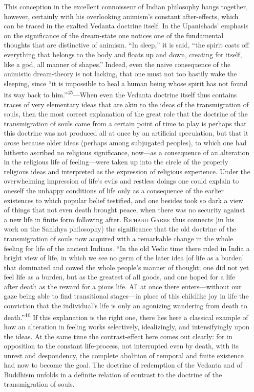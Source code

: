 \documentclass[12pt,a4paper]{book}
\newcommand{\opage}[1]{\marginnote{\footnotesize\textit{[#1]}}}
\begin{document}
This conception in the excellent connoisseur of Indian philosophy hangs together, however,
certainly with his overlooking animism's constant after-effects, which can be traced in the
exalted Vedanta doctrine itself. In the Upanishads' emphasis on the significance of the
dream-state one notices one of the fundamental thoughts that are distinctive of animism.
``In sleep,'' it is said, ``the spirit casts off everything that belongs to the body and
floats up and down, creating for itself, like a god, all manner of shapes.'' Indeed, even the
naive consequence of the animistic dream-theory is not lacking, that one must not too hastily
wake the sleeping, since ``it is impossible to heal a human being whose spirit has not found
its way back to him.''\textsuperscript{45}---When even the Vedanta doctrine itself thus
contains traces of very elementary ideas that are akin to the ideas of the transmigration of
souls, then the most correct explanation of the great role that the doctrine of the
transmigration of souls came from a certain point of time to play is perhaps that this doctrine
was not produced all at once by an artificial speculation, but that it 
\opage{99}arose because older
ideas (perhaps among subjugated peoples), to which one had hitherto ascribed no religious
significance, now---as a consequence of an alteration in the religious life of feeling---were
taken up into the circle of the properly religious ideas and interpreted as the expression of
religious experience. Under the overwhelming impression of life's evils and restless doings one
could explain to oneself the unhappy conditions of life only as a consequence of the earlier
existences to which popular belief testified, and one besides took so dark a view of things
that not even death brought peace, when there was no security against a new life in finite form
following after. \textsc{Richard Garbe} thus connects (in his work on the Sankhya philosophy)
the significance that the old doctrine of the transmigration of souls now acquired with a
remarkable change in the whole feeling for life of the ancient Indians. ``In the old Vedic time
there ruled in India a bright view of life, in which we see no germ of the later idea [of life
as a burden] that dominated and cowed the whole people's manner of thought; one did not yet
feel life as a burden, but as the greatest of all goods, and one hoped for a life after death
as the reward for a pious life. All at once there enters---without our gaze being able to find
transitional stages---in place of this childlike joy in life the conviction that the
individual's life is only an agonizing wandering from death to death.''\textsuperscript{46} If
this explanation is the right one, there lies here a classical example of how an alteration in
feeling works selectively, idealizingly, and intensifyingly upon the ideas. At the same time the
contrast-effect here comes out clearly: for in opposition to the constant life-process, not
interrupted even by death, with its unrest and despondency, the complete abolition of temporal
and finite existence had now to become the goal. The doctrine of redemption of the Vedanta and
of Buddhism unfolds in a definite relation of contrast to the doctrine of the transmigration of
souls.
\end{document}
